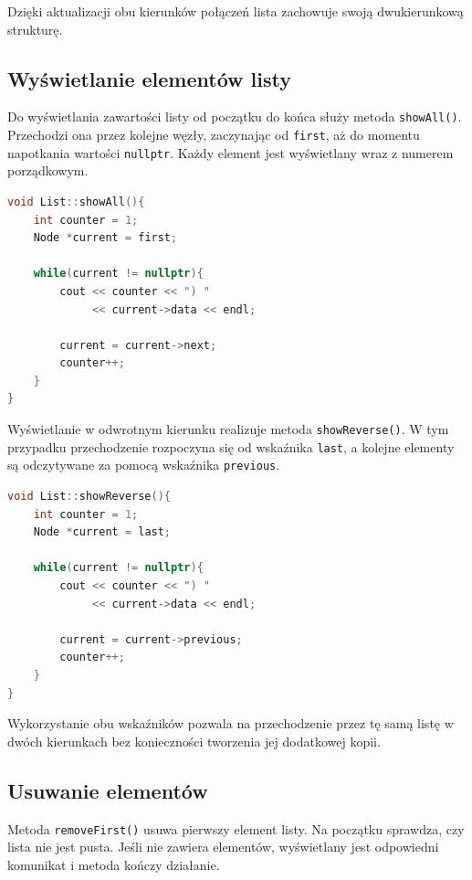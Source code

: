 Dzięki aktualizacji obu kierunków połączeń lista zachowuje swoją dwukierunkową strukturę.

\subsection{Wyświetlanie elementów listy}

Do wyświetlania zawartości listy od początku do końca służy metoda \texttt{showAll()}. Przechodzi ona przez kolejne węzły, zaczynając od \texttt{first}, aż do momentu napotkania wartości \texttt{nullptr}. Każdy element jest wyświetlany wraz z numerem porządkowym.

\begin{lstlisting}[language=C++, caption={Wyświetlanie listy w przód}]
void List::showAll(){
    int counter = 1;
    Node *current = first;

    while(current != nullptr){
        cout << counter << ") "
             << current->data << endl;

        current = current->next;
        counter++;
    }
}
\end{lstlisting}

Wyświetlanie w odwrotnym kierunku realizuje metoda \texttt{showReverse()}. W tym przypadku przechodzenie rozpoczyna się od wskaźnika \texttt{last}, a kolejne elementy są odczytywane za pomocą wskaźnika \texttt{previous}.

\begin{lstlisting}[language=C++, caption={Wyświetlanie listy w odwrotnej kolejności}]
void List::showReverse(){
    int counter = 1;
    Node *current = last;

    while(current != nullptr){
        cout << counter << ") "
             << current->data << endl;

        current = current->previous;
        counter++;
    }
}
\end{lstlisting}

Wykorzystanie obu wskaźników pozwala na przechodzenie przez tę samą listę w dwóch kierunkach bez konieczności tworzenia jej dodatkowej kopii.

\subsection{Usuwanie elementów}

Metoda \texttt{removeFirst()} usuwa pierwszy element listy. Na początku sprawdza, czy lista nie jest pusta. Jeśli nie zawiera elementów, wyświetlany jest odpowiedni komunikat i metoda kończy działanie.

